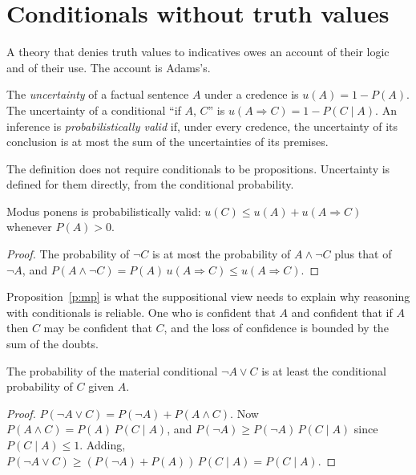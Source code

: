 \documentclass{situationist-preprint}
\begin{document}
\section{Conditionals without truth values}\label{s:adams}

A theory that denies truth values to indicatives owes an account of their logic and of their use. The account is Adams's.

\begin{definition}\label{d:unc}
The \emph{uncertainty} of a factual sentence $A$ under a credence is $u(A) = 1 - P(A)$. The uncertainty of a conditional \enquote{if $A$, $C$} is $u(A \Rightarrow C) = 1 - P(C \mid A)$. An inference is \emph{probabilistically valid} if, under every credence, the uncertainty of its conclusion is at most the sum of the uncertainties of its premises.
\end{definition}

The definition does not require conditionals to be propositions. Uncertainty is defined for them directly, from the conditional probability.

\begin{proposition}[Adams]\label{p:mp}
Modus ponens is probabilistically valid: $u(C) \leq u(A) + u(A \Rightarrow C)$ whenever $P(A) > 0$.
\end{proposition}

\begin{proof}
The probability of $\neg C$ is at most the probability of $A \wedge \neg C$ plus that of $\neg A$, and $P(A \wedge \neg C) = P(A)\, u(A \Rightarrow C) \leq u(A \Rightarrow C)$.
\end{proof}

Proposition~\ref{p:mp} is what the suppositional view needs to explain why reasoning with conditionals is reliable. One who is confident that $A$ and confident that if $A$ then $C$ may be confident that $C$, and the loss of confidence is bounded by the sum of the doubts.

\begin{proposition}\label{p:matge}
The probability of the material conditional $\neg A \vee C$ is at least the conditional probability of $C$ given $A$.
\end{proposition}

\begin{proof}
$P(\neg A \vee C) = P(\neg A) + P(A \wedge C)$. Now $P(A \wedge C) = P(A)\,P(C \mid A)$, and $P(\neg A) \geq P(\neg A)\, P(C \mid A)$ since $P(C \mid A) \leq 1$. Adding, $P(\neg A \vee C) \geq (P(\neg A) + P(A))\, P(C \mid A) = P(C \mid A)$.
\end{proof}
\end{document}
